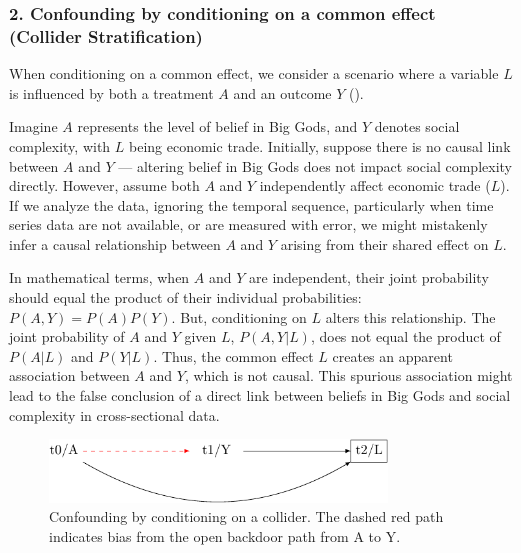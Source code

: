 \documentclass[
  singlecolumn,
  9pt]{article}
\begin{document}
\subsubsection{2. Confounding by conditioning on a common effect
(Collider
Stratification)}\label{confounding-by-conditioning-on-a-common-effect-collider-stratification}

When conditioning on a common effect, we consider a scenario where a
variable \(L\) is influenced by both a treatment \(A\) and an outcome
\(Y\) ().

Imagine \(A\) represents the level of belief in Big Gods, and \(Y\)
denotes social complexity, with \(L\) being economic trade. Initially,
suppose there is no causal link between \(A\) and \(Y\) --- altering
belief in Big Gods does not impact social complexity directly. However,
assume both \(A\) and \(Y\) independently affect economic trade (\(L\)).
If we analyze the data, ignoring the temporal sequence, particularly
when time series data are not available, or are measured with error, we
might mistakenly infer a causal relationship between \(A\) and \(Y\)
arising from their shared effect on \(L\).

In mathematical terms, when \(A\) and \(Y\) are independent, their joint
probability should equal the product of their individual probabilities:
\(P(A, Y) = P(A)P(Y)\). But, conditioning on \(L\) alters this
relationship. The joint probability of \(A\) and \(Y\) given \(L\),
\(P(A, Y | L)\), does not equal the product of \(P(A | L)\) and
\(P(Y | L)\). Thus, the common effect \(L\) creates an apparent
association between \(A\) and \(Y\), which is not causal. This spurious
association might lead to the false conclusion of a direct link between
beliefs in Big Gods and social complexity in cross-sectional data.

\begin{figure}

{\centering \includegraphics[width=0.8\textwidth,height=\textheight]{causal-dags_files/figure-pdf/fig-dag-common-effect-1.pdf}

}

\caption{\label{fig-dag-common-effect}Confounding by conditioning on a
collider. The dashed red path indicates bias from the open backdoor path
from A to Y.}

\end{figure}
\end{document}
